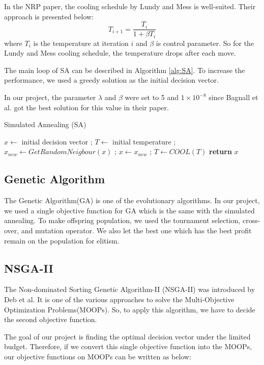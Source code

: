 In the NRP paper\cite{NRP}, the cooling schedule by Lundy and Mess\cite{LundySA} is well-suited. Their approach is presented below:
\[
    T_{i+1} = \frac{T_i}{1 + \beta T_i}
\]
where $T_i$ is the temperature at iteration $i$ and $\beta$ is control parameter. So for the Lundy and Mess cooling schedule, the temperature drops after each move.

The main loop of SA can be described in Algorithm \ref{alg:SA}. To increase the performance, we used a greedy solution as the initial decision vector. 

In our project, the parameter $\lambda$ and $\beta$ were set to 5 and $1 \times 10^{-8}$ since Bagnall et al. got the best solution for this value in their paper.


\begin{algorithm}
\caption{Simulated Annealing (SA)}\label{alg:SA}
\begin{algorithmic}
    \State $x \gets$ initial decision vector ;
    \State $T \gets$ initial temperature ; 
        \State $x_{new} \gets GetRandomNeigbour(x)$ ;
            \State $x \gets x_{new}$ ;
        \EndIf
        \State $T \gets COOL(T)$ 
    \EndWhile
    \textbf{return} $x$
\end{algorithmic}
\end{algorithm}

\subsection{Genetic Algorithm}
The Genetic Algorithm(GA) is one of the evolutionary algorithms. In our project, we used a single objective function for GA which is the same with the simulated annealing. To make offspring population, we used the tournament selection, cross-over, and mutation operator. We also let the best one which has the best profit remain on the population for elitism.

\subsection{NSGA-II}
The Non-dominated Sorting Genetic Algorithm-II (NSGA-II) was introduced by Deb et al.\cite{NSGA2} It is one of the various approaches to solve the Multi-Objective Optimization Problems(MOOPs). So, to apply this algorithm, we have to decide the second objective function. 

The goal of our project is finding the optimal decision vector under the limited budget. Therefore, if we convert this single objective function into the MOOPs, our objective functions on MOOPs can be written as below:


